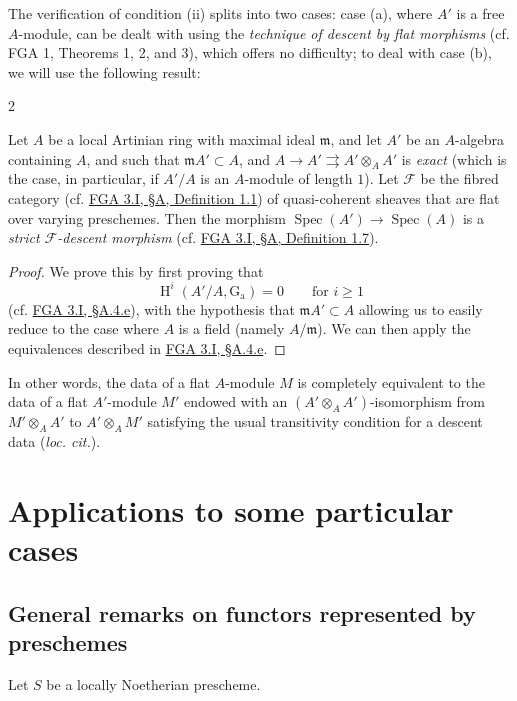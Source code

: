   The verification of condition (ii) splits into two cases: case (a), where \(A'\) is a free \(A\)-module, can be dealt with using the \emph{technique of descent by flat morphisms} (cf. FGA 1, Theorems 1, 2, and 3), which offers no difficulty;
  to deal with case (b), we will use the following result:\begin{theorem}{2}\label{fga3.ii-b-theorem-2}\skipsinglepar\par{}Let \(A\) be a local Artinian ring with maximal ideal \(\mathfrak {m}\), and let \(A'\) be an \(A\)-algebra containing \(A\), and such that \(\mathfrak {m}A'\subset  A\), and \(A\to  A'\rightrightarrows  A'\otimes _A A'\) is \emph{exact} (which is the case, in particular, if \(A'/A\) is an \(A\)-module of length \(1\)).
    Let \(\mathcal {F}\) be the fibred category (cf. \hyperref[fga3.i-a.1-definition-1.1]{FGA 3.I, §A, Definition 1.1}) of quasi-coherent sheaves that are flat over varying preschemes.
    Then the morphism \(\operatorname {Spec}(A')\to \operatorname {Spec}(A)\) is a \emph{strict \(\mathcal {F}\)-descent morphism} (cf. \hyperref[fga3.i-a.1-definition-1.7]{FGA 3.I, §A, Definition 1.7}).\begin{proof}\par{}We prove this by first proving that
      \[         \operatorname {H}^i(A'/A,\operatorname {G_a}) = 0         \qquad \text {for }i\geqslant 1       \]
      (cf. \hyperref[fga3.i-a.4.e]{FGA 3.I, §A.4.e}), with the hypothesis that \(\mathfrak {m}A'\subset  A\) allowing us to easily reduce to the case where \(A\) is a field (namely \(A/\mathfrak {m}\)).
      We can then apply the equivalences described in \hyperref[fga3.i-a.4.e]{FGA 3.I, §A.4.e}.\end{proof}\end{theorem}\par{}In other words, the data of a flat \(A\)-module \(M\) is completely equivalent to the data of a flat \(A'\)-module \(M'\) endowed with an \((A'\otimes _A A')\)-isomorphism from \(M'\otimes _A A'\) to \(A'\otimes _A M'\) satisfying the usual transitivity condition for a descent data (\emph{loc. cit.}).\chapter{Applications to some particular cases}\thispagestyle{fancy}\label{fga3.ii-c}\section{General remarks on functors represented by preschemes}\label{fga3.ii-c.1}\par{}Let \(S\) be a locally Noetherian prescheme.
  

